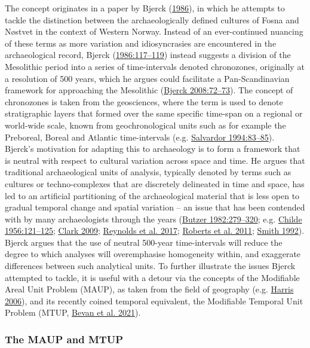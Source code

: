 \documentclass[
  a4paper,
  oneside]{uiophdthesis}
\begin{document}
The concept originates in a paper by Bjerck (\protect\hyperlink{ref-bjerck1986}{1986}), in which he attempts to tackle the distinction between the archaeologically defined cultures of Fosna and Nøstvet in the context of Western Norway. Instead of an ever-continued nuancing of these terms as more variation and idiosyncrasies are encountered in the archaeological record, Bjerck (\protect\hyperlink{ref-bjerck1986}{1986:117--119}) instead suggests a division of the Mesolithic period into a series of time-intervals denoted chronozones, originally at a resolution of 500 years, which he argues could facilitate a Pan-Scandinavian framework for approaching the Mesolithic (\protect\hyperlink{ref-bjerck2008}{Bjerck 2008:72--73}). The concept of chronozones is taken from the geosciences, where the term is used to denote stratigraphic layers that formed over the same specific time-span on a regional or world-wide scale, known from geochronological units such as for example the Preboreal, Boreal and Atlantic time-intervals (e.g. \protect\hyperlink{ref-salvador1994}{Salvardor 1994:83--85}). Bjerck's motivation for adapting this to archaeology is to form a framework that is neutral with respect to cultural variation across space and time. He argues that traditional archaeological units of analysis, typically denoted by terms such as cultures or techno-complexes that are discretely delineated in time and space, has led to an artificial partitioning of the archaeological material that is less open to gradual temporal change and spatial variation -- an issue that has been contended with by many archaeologists through the years (\protect\hyperlink{ref-butzer1982}{Butzer 1982:279--320}; e.g. \protect\hyperlink{ref-childe1956}{Childe 1956:121--125}; \protect\hyperlink{ref-clark2009}{Clark 2009}; \protect\hyperlink{ref-reynolds2017}{Reynolds et al. 2017}; \protect\hyperlink{ref-roberts2011}{Roberts et al. 2011}; \protect\hyperlink{ref-smith1992}{Smith 1992}). Bjerck argues that the use of neutral 500-year time-intervals will reduce the degree to which analyses will overemphasise homogeneity within, and exaggerate differences between such analytical units. To further illustrate the issues Bjerck attempted to tackle, it is useful with a detour via the concepts of the Modifiable Areal Unit Problem (MAUP), as taken from the field of geography (e.g. \protect\hyperlink{ref-harris2006}{Harris 2006}), and its recently coined temporal equivalent, the Modifiable Temporal Unit Problem (MTUP, \protect\hyperlink{ref-bevan2021}{Bevan et al. 2021}).

\hypertarget{the-maup-and-mtup}{%
\subsubsection{The MAUP and MTUP}\label{the-maup-and-mtup}}
\end{document}
